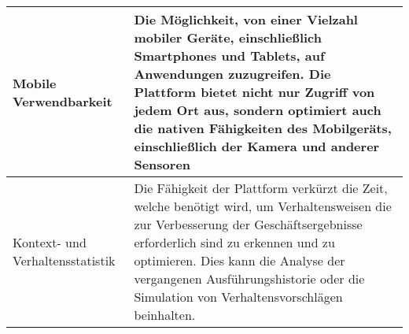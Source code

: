 \begin{longtable}{p{4.5cm}X}
  \\ \hline
  Mobile Verwendbarkeit & Die Möglichkeit, von einer Vielzahl mobiler Geräte, einschließlich Smartphones und Tablets, auf Anwendungen zuzugreifen. Die Plattform bietet nicht nur Zugriff von jedem Ort aus, sondern optimiert auch die nativen Fähigkeiten des Mobilgeräts, einschließlich der Kamera und anderer Sensoren
  \\ \hline
  Kontext- und Verhaltensstatistik & Die Fähigkeit der Plattform verkürzt die Zeit, welche benötigt wird, um Verhaltensweisen die zur Verbesserung der Geschäftsergebnisse erforderlich sind zu erkennen und zu optimieren. Dies kann die Analyse der vergangenen Ausführungshistorie oder die Simulation von Verhaltensvorschlägen beinhalten.
  \\ \hline
 \end{longtable}
